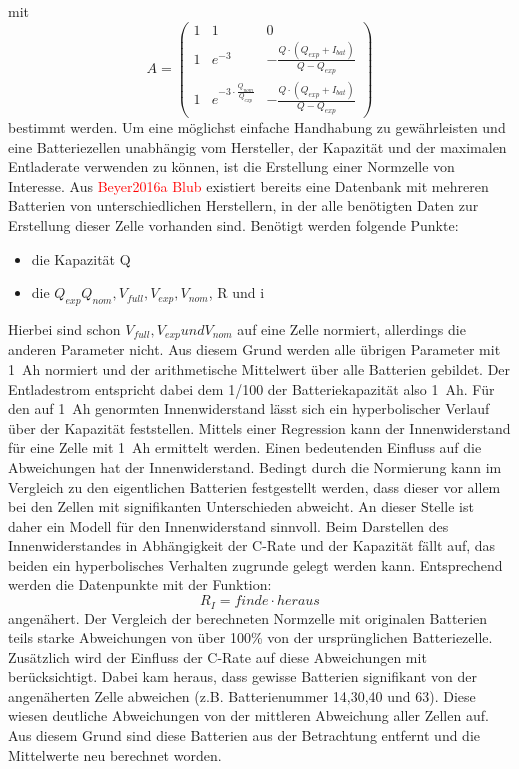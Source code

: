 mit
\begin{equation}
	A = \begin{pmatrix}
	1 & 1 & 0 \\ 1 & e^{-3} & -\frac{Q\cdot (Q_{exp}+I_{bat})}{Q-Q_{exp}} \\ 1 & e^{-3\cdot\frac{Q_{nom}}{Q_{exp}}} & -\frac{Q\cdot (Q_{exp}+I_{bat})}{Q-Q_{exp}}
	\end{pmatrix}
\end{equation}
bestimmt werden.
Um eine möglichst einfache Handhabung zu gewährleisten und eine Batteriezellen unabhängig vom Hersteller, der Kapazität und der maximalen Entladerate verwenden zu können, ist die Erstellung einer Normzelle von Interesse. Aus \textcolor{red}{Beyer2016a Blub} existiert bereits eine Datenbank mit mehreren Batterien von unterschiedlichen Herstellern, in der alle benötigten Daten zur Erstellung dieser Zelle vorhanden sind. Benötigt werden folgende Punkte: 
\begin{itemize}
	\item die Kapazität Q
	\item die $Q_{exp} Q_{nom}, V_{full}, V_{exp}, V_{nom}$, R und i
\end{itemize}
Hierbei sind schon $V_{full}, V_{exp} und V_{nom}$ auf eine Zelle normiert, allerdings die anderen Parameter nicht. Aus diesem Grund werden alle übrigen Parameter mit \SI{1}{Ah} normiert und der arithmetische Mittelwert über alle Batterien gebildet. Der Entladestrom entspricht dabei dem 1/100 der Batteriekapazität also \SI{1}{Ah}. Für den auf \SI{1}{Ah} genormten Innenwiderstand lässt sich ein hyperbolischer Verlauf über der Kapazität feststellen. Mittels einer Regression kann der Innenwiderstand für eine Zelle mit \SI{1}{Ah} ermittelt werden. 
Einen bedeutenden Einfluss auf die Abweichungen hat der Innenwiderstand. Bedingt durch die Normierung kann im Vergleich zu den eigentlichen Batterien festgestellt werden, dass dieser vor allem bei den Zellen mit signifikanten Unterschieden abweicht. An dieser Stelle ist daher ein Modell für den Innenwiderstand sinnvoll. Beim Darstellen des Innenwiderstandes in Abhängigkeit der C-Rate und der Kapazität fällt auf, das beiden ein hyperbolisches Verhalten zugrunde gelegt werden kann. 
Entsprechend werden die Datenpunkte mit der Funktion:
\begin{equation}
	R_I = finde\cdot heraus
\end{equation}
angenähert.
Der Vergleich der berechneten Normzelle mit originalen Batterien teils starke Abweichungen von über 100\% von der ursprünglichen Batteriezelle. Zusätzlich wird der Einfluss der C-Rate auf diese Abweichungen mit berücksichtigt. Dabei kam heraus, dass gewisse Batterien signifikant von der angenäherten Zelle abweichen (z.B. Batterienummer 14,30,40 und 63). Diese wiesen deutliche Abweichungen von der mittleren Abweichung aller Zellen auf. Aus diesem Grund sind diese Batterien aus der Betrachtung entfernt und die Mittelwerte neu berechnet worden.




